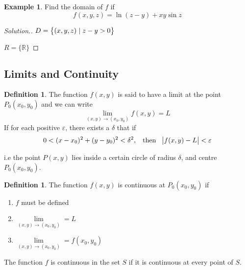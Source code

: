 \documentclass[11pt,a4paper]{article}
\theoremstyle{definition}
\newtheorem{defn}[thm]{Definition}
\newtheorem{exa}[thm]{Example}
\newenvironment{solution}
  {\renewcommand{\qedsymbol}{}\begin{proof}[\textit{Solution}.]}
  {\end{proof}}
\begin{document}
\begin{exa}


Find the domain of $f$ if $$f(x,y,z) = \ln (z-y) + xy\sin z$$
\end{exa}

\begin{solution}


$\displaystyle{D = \big\{(x,y,z) \hspace{0.1cm} |\hspace{0.1cm} z - y > 0\big\}}$


\begin{figure}[H]
\centering
{}
\end{figure}

$\displaystyle{R = \big\{\mathbb{R}\big\}}$
\end{solution}


{\color[wave]{485}\subsection{Limits and Continuity}}

\begin{defn}


The function $f(x,y)$ is said to have a limit at the point $P_0(x_0,y_0)$ and we can write $$ \lim\limits_{(x,y) \longrightarrow (x_0,y_0)}f(x,y) = L$$
If for each positive $\varepsilon$, there exists a $\delta$ that if $$0 < (x-x_0)^2 + (y-y_0)^2 <\delta^2, \hspace{0.3cm}\text{then}\hspace{0.3cm} \big|f(x,y) - L\big| < \varepsilon$$

i.e the point $P(x,y)$ lies inside a certain circle of radius $\delta$, and centre $P_0(x_0,y_0)$.
\end{defn}


\begin{defn}


The function $f(x,y)$ is continuous at $P_0(x_0,y_0)$ if 
\begin{enumerate}
\item $f$ must be defined

\item $\displaystyle{\lim\limits_{(x,y)\longrightarrow (x_0,y_0)} = L}$

\item $\displaystyle{\lim\limits_{(x,y)\longrightarrow (x_0,y_0)} = f(x_0,y_0)}$
\end{enumerate}

The function $f$ is continuous in the set $S$ if it is continuous at every point of $S$.
\end{defn}
\end{document}
